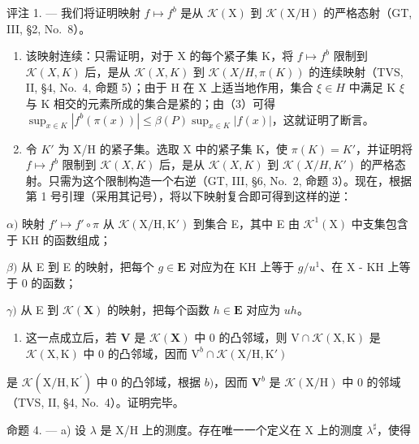 评注 1. --- 我们将证明映射 \(f \mapsto f^{b}\) 是从 \(\mathcal{K}(\mathrm{X})\) 到 \(\mathcal{K}(\mathrm{X}/\mathrm{H})\) 的严格态射（GT, III, §2, No.~8）。

\begin{enumerate}
\def\labelenumi{\alph{enumi})}
\item
  该映射连续：只需证明，对于 X 的每个紧子集 K，将 \(f \mapsto f^{b}\) 限制到 \(\mathcal{K}(X, K)\) 后，是从 \(\mathcal{K}(X, K)\) 到 \(\mathcal{K}(X / H, \pi(K))\) 的连续映射（TVS, II, §4, No.~4, 命题 5）；由于 H 在 X 上适当地作用，集合 \(\xi \in H\) 中满足 K \(\xi\) 与 K 相交的元素所成的集合是紧的；由（3）可得 \(\sup_{x \in K} |f^{b}(\pi(x))| \leqslant \beta(P) \sup_{x \in K} |f(x)|\)，这就证明了断言。
\item
  令 \(K'\) 为 X/H 的紧子集。选取 X 中的紧子集 K，使 \(\pi(K) = K'\)，并证明将 \(f \mapsto f^{b}\) 限制到 \(\mathcal{K}(X, K)\) 后，是从 \(\mathcal{K}(X, K)\) 到 \(\mathcal{K}(X/H, K')\) 的严格态射。只需为这个限制构造一个右逆（GT, III, §6, No.~2, 命题 3）。现在，根据第 1 号引理（采用其记号），将以下映射复合即可得到这样的逆：
\end{enumerate}

\(\alpha)\) 映射 \(f' \mapsto f' \circ \pi\) 从 \(\mathcal{K}(\mathrm{X}/\mathrm{H}, \mathrm{K}')\) 到集合 E，其中 E 由 \(\mathcal{K}^1(\mathrm{X})\) 中支集包含于 KH 的函数组成；

\(\beta)\) 从 E 到 E 的映射，把每个 \(g \in \mathbf{E}\) 对应为在 KH 上等于 \(g / u^1\)、在 X - KH 上等于 0 的函数；

\(\gamma)\) 从 E 到 \(\mathcal{K}(\mathbf{X})\) 的映射，把每个函数 \(h \in \mathbf{E}\) 对应为 \(uh\)。

\begin{enumerate}
\def\labelenumi{\alph{enumi})}
\setcounter{enumi}{2}
\tightlist
\item
  这一点成立后，若 \(\mathbf{V}\) 是 \(\mathcal{K}(\mathbf{X})\) 中 0 的凸邻域，则 \(\mathrm{V} \cap \mathcal{K}(\mathrm{X}, \mathrm{K})\) 是 \(\mathcal{K}(\mathrm{X}, \mathrm{K})\) 中 0 的凸邻域，因而 \(\mathrm{V}^{b} \cap \mathcal{K}(\mathrm{X} / \mathrm{H}, \mathrm{K}')\)
\end{enumerate}

是 \(\mathcal{K}(\mathrm{X / H},\mathrm{K}^{\prime})\) 中 0 的凸邻域，根据 \(b)\)，因而 \(\mathbf{V}^b\) 是 \(\mathcal{K}(\mathrm{X / H})\) 中 0 的邻域（TVS, II, §4, No.~4）。证明完毕。

命题 4. --- a) 设 \(\lambda\) 是 X/H 上的测度。存在唯一一个定义在 X 上的测度 \(\lambda^{\sharp}\)，使得

